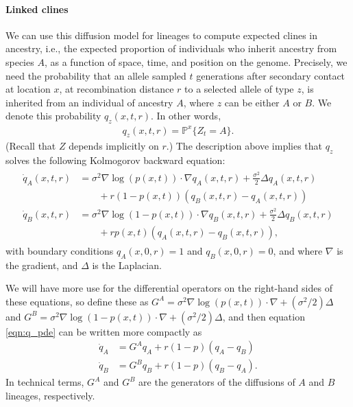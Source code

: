 \documentclass[11pt,letterpaper]{article}
\newcommand{\alisa}[1]{{\em \color{red} #1}}
\newcommand{\plr}[1]{{\em \color{blue} #1}}
\renewcommand{\P}{\mathbb{P}}
\newcommand{\grad}{\nabla}
\begin{document}
\paragraph{Linked clines}
We can use this diffusion model for lineages to compute expected clines in ancestry,
i.e., the expected proportion of individuals who inherit ancestry from species $A$,
as a function of space, time, and position on the genome.
Precisely, we need the probability that 
an allele sampled $t$ generations after secondary contact at location $x$,
at recombination distance $r$ to a selected allele of type $z$,
is inherited from an individual of ancestry $A$,
where $z$ can be either $A$ or $B$.
We denote this probability $q_z(x,t,r)$.
In other words,
\begin{align}
    q_z(x,t,r) = \P^x \{Z_t = A\} .
\end{align}
(Recall that $Z$ depends implicitly on $r$.)
The description above implies that $q_z$ solves the following Kolmogorov backward equation:
\begin{align}
    \begin{aligned}  \label{eqn:q_pde}
    \dot q_A(x,t,r) 
            &= \sigma^2 \grad \log(p(x,t)) \cdot \grad q_A(x,t,r) 
                + \frac{\sigma^2}{2} \Delta q_A(x,t,r) 
            \\ &\qquad {} + 
                r (1-p(x,t))(q_B(x,t,r)-q_A(x,t,r))  \\
    \dot q_B(x,t,r) &= \sigma^2 \grad \log(1-p(x,t)) \cdot \grad q_B(x,t,r) 
            + \frac{\sigma^2}{2} \Delta q_B(x,t,r)
            \\ &\qquad {} + 
            r p(x,t) (q_A(x,t,r)-q_B(x,t,r))  ,
    \end{aligned} 
\end{align}
with boundary conditions $q_A(x,0,r)=1$ and $q_B(x,0,r)=0$, 
and where $\grad$ is the gradient, and $\Delta$ is the Laplacian.

We will have more use for the differential operators on the right-hand sides of these equations,
so define these as
$G^A = \sigma^2 \grad \log(p(x,t)) \cdot \grad + (\sigma^2/2) \Delta$
and
$G^B = \sigma^2 \grad \log(1-p(x,t)) \cdot \grad + (\sigma^2/2) \Delta$,
and then equation \eqref{eqn:q_pde} can be written more compactly as
\begin{align*}
    \dot q_A &= G^A q_A + r (1-p) (q_A-q_B) \\
    \dot q_B &= G^B q_B + r (1-p) (q_B-q_A) .
\end{align*}
In technical terms, $G^A$ and $G^B$ are the generators of the diffusions of $A$ and $B$ lineages, respectively.
\end{document}
